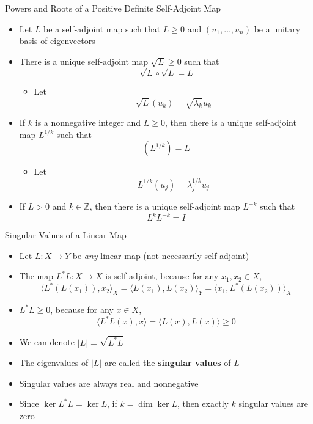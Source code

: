 \documentclass[usenames,dvipsnames,10pt]{beamer}
\newcommand{\Z}{\mathbb{Z}}
\begin{document}
\begin{frame}
  {Powers and Roots of a Positive Definite Self-Adjoint Map}

  \begin{itemize}
  \item Let $L$ be a self-adjoint map such that $L \ge 0$ and $(u_1, \dots, u_n)$ be a unitary basis of eigenvectors
  \item There is a unique self-adjoint map $\sqrt{L} \ge 0$ such that
    \[
      \sqrt{L}\circ\sqrt{L} = L
    \]
    \begin{itemize}
    \item Let
      \[
        \sqrt{L}(u_k) = \sqrt{\lambda_k}u_k
      \]
    \end{itemize}
  \item If $k$ is a nonnegative integer and $L \ge 0$, then there is a unique self-adjoint map $L^{1/k}$ such that
    \[
      (L^{1/k}) = L
    \]
    \begin{itemize}
    \item Let
      \[
        L^{1/k}(u_j) = \lambda_j^{1/k}u_j
      \]
    \end{itemize}
  \item If $L > 0$ and $k \in \Z$, then there is a unique self-adjoint map $L^{-k}$ such that
    \[ L^kL^{-k} = I \]
  \end{itemize}
\end{frame}

\begin{frame}
  {Singular Values of a Linear Map}

  \begin{itemize}
  \item Let $L: X \rightarrow Y$ be {\em any} linear map (not necessarily self-adjoint)
  \item The map $L^*L: X \rightarrow X$ is self-adjoint, because for any $x_1, x_2 \in X$,
    \[
      \langle L^*(L(x_1)), x_2\rangle_X = \langle L(x_1),L(x_2)\rangle_Y = \langle x_1, L^*(L(x_2))\rangle_X
    \]
  \item $L^*L \ge 0$, because for any $x \in X$,
    \[
      \langle L^*L(x), x\rangle = \langle L(x),L(x)\rangle \ge 0
    \]
  \item We can denote $|L| = \sqrt{L^*L}$
  \item The eigenvalues of $|L|$ are called the {\bf singular values} of $L$
  \item Singular values are always real and nonnegative
  \item Since $\ker L^*L = \ker L$, if $k = \dim\ker L$, then exactly $k$ singular values are zero
  \end{itemize}
\end{frame}
\end{document}
